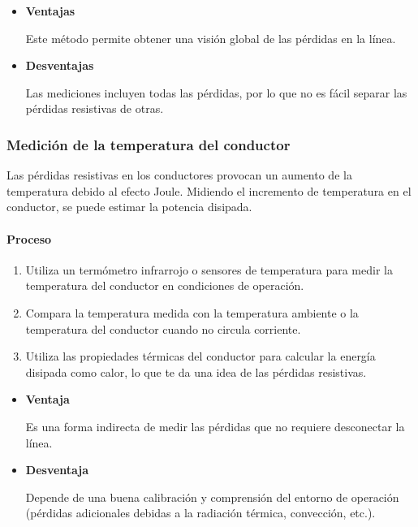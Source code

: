             \begin{itemize}
                \item \textbf{Ventajas}

                    Este método permite obtener una visión global de las pérdidas en la línea.

                    
                \item \textbf{Desventajas}

                    Las mediciones incluyen todas las pérdidas, por lo que no es fácil separar las pérdidas resistivas de otras.
                    
            \end{itemize}

        \subsubsection{Medición de la temperatura del conductor}

             Las pérdidas resistivas en los conductores provocan un aumento de la temperatura debido al efecto Joule. Midiendo el incremento de temperatura en el conductor, se puede estimar la potencia disipada.

             \paragraph{Proceso}

                \begin{enumerate}
                    \item Utiliza un termómetro infrarrojo o sensores de temperatura para medir la temperatura del conductor en condiciones de operación.
                    
                    \item Compara la temperatura medida con la temperatura ambiente o la temperatura del conductor cuando no circula corriente.
                    
                    \item Utiliza las propiedades térmicas del conductor para calcular la energía disipada como calor, lo que te da una idea de las pérdidas resistivas.
                    
                \end{enumerate}


            \begin{itemize}
                \item \textbf{Ventaja}
                
                     Es una forma indirecta de medir las pérdidas que no requiere desconectar la línea.

                     
                \item \textbf{Desventaja}

                     Depende de una buena calibración y comprensión del entorno de operación (pérdidas adicionales debidas a la radiación térmica, convección, etc.).
            \end{itemize}

